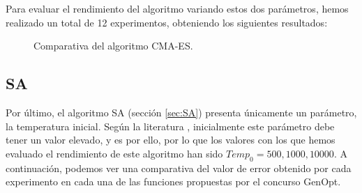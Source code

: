 Para evaluar el rendimiento del algoritmo variando estos dos parámetros, hemos realizado un total de 12 experimentos, obteniendo los siguientes resultados:

\begin{figure}[!ht]
  \centering
	\captionsetup{justification=centering}
  \caption{Comparativa del algoritmo CMA-ES.}
\end{figure}

\subsection{SA}\label{sec:paramSA}

Por último, el algoritmo SA (sección \ref{sec:SA}) presenta únicamente un parámetro, la temperatura inicial. Según la literatura \cite{metabook}, inicialmente este parámetro debe tener un valor elevado, y es por ello, por lo que los valores con los que hemos evaluado el rendimiento de este algoritmo han sido $Temp_{0} = 500, 1000, 10000$. A continuación, podemos ver una comparativa del valor de error obtenido por cada experimento en cada una de las funciones propuestas por el concurso GenOpt. 

